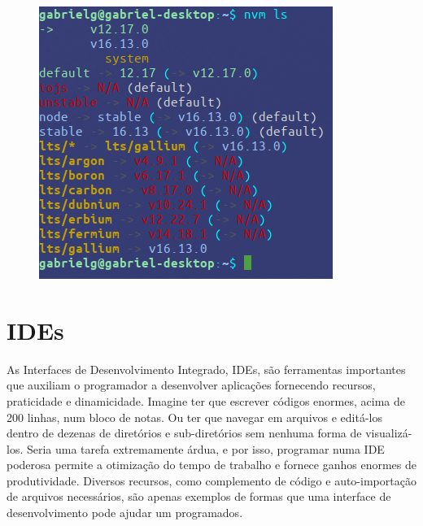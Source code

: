 \begin{figure}[H]
	\centering
	\includegraphics[width=0.6\linewidth]{Pictures/nvm_LS}
	\caption{}
	\label{fig:nvmls}
\end{figure}
    

	\section{IDEs}
	As Interfaces de Desenvolvimento Integrado, IDEs, são ferramentas importantes que auxiliam o programador a desenvolver aplicações fornecendo recursos, praticidade e dinamicidade. Imagine ter que escrever códigos enormes, acima de 200 linhas, num bloco de notas. Ou ter que navegar em arquivos e editá-los dentro de dezenas de diretórios e sub-diretórios sem nenhuma forma de visualizá-los. Seria uma tarefa extremamente árdua, e por isso, programar numa IDE poderosa permite a otimização do tempo de trabalho e fornece ganhos enormes de produtividade. Diversos recursos, como complemento de código e auto-importação de arquivos necessários, são apenas exemplos de formas que uma interface de desenvolvimento pode ajudar um programados.
	
